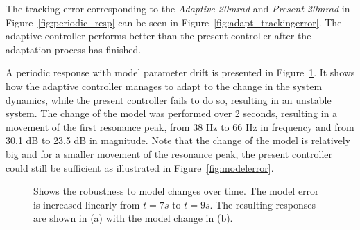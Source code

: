 The tracking error corresponding to the \emph{Adaptive 20mrad} and \emph{Present 20mrad} in Figure~\ref{fig:periodic_resp} can be seen in Figure~\ref{fig:adapt_trackingerror}. The adaptive controller performs better than the present controller after the adaptation process has finished.

A periodic response with model parameter drift is presented in Figure~\ref{fig:modeldrift}. It shows how the adaptive controller manages to adapt to the change in the system dynamics, while the present controller fails to do so, resulting in an unstable system. The change of the model was performed over 2 seconds, resulting in a movement of the first resonance peak, from 38 Hz to 66 Hz in frequency and from 30.1 dB to 23.5 dB in magnitude. Note that the change of the model is relatively big and for a smaller movement of the resonance peak, the present controller could still be sufficient as illustrated in Figure~\ref{fig:modelerror}.
\begin{figure}[h!]
  \centering %
  \qquad
  \caption{\label{fig:modeldrift} Shows the robustness to model changes over time. The model error is increased linearly from $t=7s$ to $t=9s$. The resulting responses are shown in (a) with the model change in (b).}
\end{figure}

